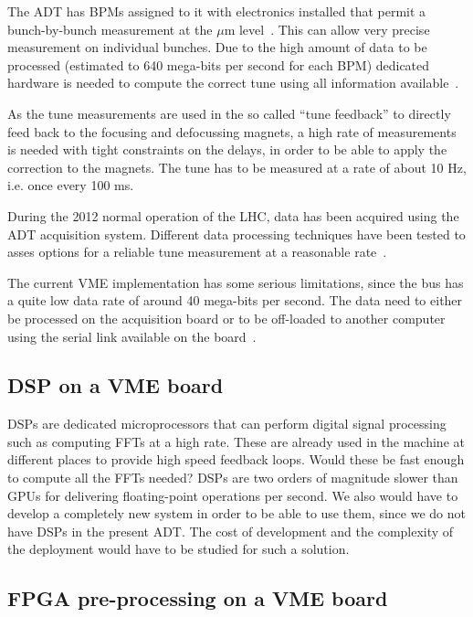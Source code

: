 The \gls{ADT} has \glspl{BPM} assigned to it with electronics installed that permit a bunch-by-bunch measurement at the $\mu$m level~\cite{BphMeas07}. This can allow very precise measurement on individual bunches. Due to the high amount of data to be processed (estimated to 640 mega-bits per second for each \gls{BPM}) dedicated hardware is needed to compute the correct tune using all information available~\cite{HofleChamonix12}.

As the tune measurements are used in the so called ``tune feedback'' to directly feed back to the focusing and defocussing magnets, a high rate of measurements is needed with tight constraints on the delays, in order to be able to apply the correction to the magnets. The \gls{tune} has to be measured at a rate of about 10 Hz, i.e. once every 100 ms.

During the 2012 normal operation of the \gls{LHC}, data has been acquired using the \gls{ADT} acquisition system. Different data processing techniques have been tested to asses options for a reliable \gls{tune} measurement at a reasonable rate~\cite{HofleChamonix12}.

The current \gls{VME} implementation has some serious limitations, since the bus has a quite low data rate of around 40 mega-bits per second. The data need to either be processed on the acquisition board or to be off-loaded to another computer using the serial link available on the board~\cite{Baudrenghien:1124094}.

\subsection{DSP on a VME board}

\Glspl{DSP} are dedicated microprocessors that can perform digital signal processing such as computing \glspl{FFT} at a high rate. These are already used in the machine at different places to provide high speed feedback loops. Would these be fast enough to compute all the \glspl{FFT} needed? \glspl{DSP} are two orders of magnitude slower than \glspl{GPU} for delivering floating-point operations per second. We also would have to develop a completely new system in order to be able to use them, since we do not have \glspl{DSP} in the present \gls{ADT}. The cost of development and the complexity of the deployment would have to be studied for such a solution.

\subsection{FPGA pre-processing on a VME board}

